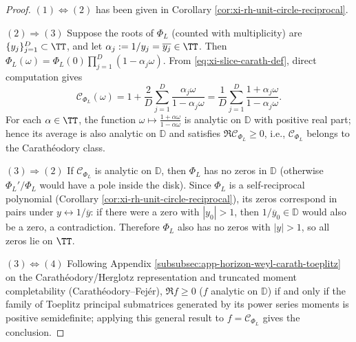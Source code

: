 \begin{proof}
\((1)\Longleftrightarrow(2)\) has been given in Corollary \ref{cor:xi-rh-unit-circle-reciprocal}.
\par
\((2)\Rightarrow(3)\) Suppose the roots of \(\Phi_L\) (counted with multiplicity) are \(\{y_j\}_{j=1}^{D}\subset\TT\), and let \(\alpha_j:=1/y_j=\overline{y_j}\in\TT\).
Then \(\Phi_L(\omega)=\Phi_L(0)\prod_{j=1}^{D}(1-\alpha_j\omega)\).
From \eqref{eq:xi-slice-carath-def}, direct computation gives
\[
\mathscr{C}_{\Phi_L}(\omega)
=1+\frac{2}{D}\sum_{j=1}^{D}\frac{\alpha_j\omega}{1-\alpha_j\omega}
=\frac{1}{D}\sum_{j=1}^{D}\frac{1+\alpha_j\omega}{1-\alpha_j\omega}.
\]
For each \(\alpha\in\TT\), the function \(\omega\mapsto\frac{1+\alpha\omega}{1-\alpha\omega}\) is analytic on \(\mathbb{D}\) with positive real part;
hence its average is also analytic on \(\mathbb{D}\) and satisfies \(\Re\mathscr{C}_{\Phi_L}\ge 0\), i.e., \(\mathscr{C}_{\Phi_L}\) belongs to the Carath\'eodory class.
\par
\((3)\Rightarrow(2)\) If \(\mathscr{C}_{\Phi_L}\) is analytic on \(\mathbb{D}\), then \(\Phi_L\) has no zeros in \(\mathbb{D}\) (otherwise \(\Phi_L'/\Phi_L\) would have a pole inside the disk).
Since \(\Phi_L\) is a self-reciprocal polynomial (Corollary \ref{cor:xi-rh-unit-circle-reciprocal}), its zeros correspond in pairs under \(y\leftrightarrow 1/\overline y\): if there were a zero with \(|y_0|>1\), then \(1/\overline y_0\in\mathbb{D}\) would also be a zero, a contradiction.
Therefore \(\Phi_L\) also has no zeros with \(|y|>1\), so all zeros lie on \(\TT\).
\par
\((3)\Longleftrightarrow(4)\) Following Appendix \ref{subsubsec:app-horizon-weyl-carath-toeplitz} on the Carath\'eodory/Herglotz representation and truncated moment completability (Carath\'eodory--Fej\'er),
\(\Re f\ge 0\) (\(f\) analytic on \(\mathbb{D}\)) if and only if the family of Toeplitz principal submatrices generated by its power series moments is positive semidefinite;
applying this general result to \(f=\mathscr{C}_{\Phi_L}\) gives the conclusion. \qedhere
\end{proof}

